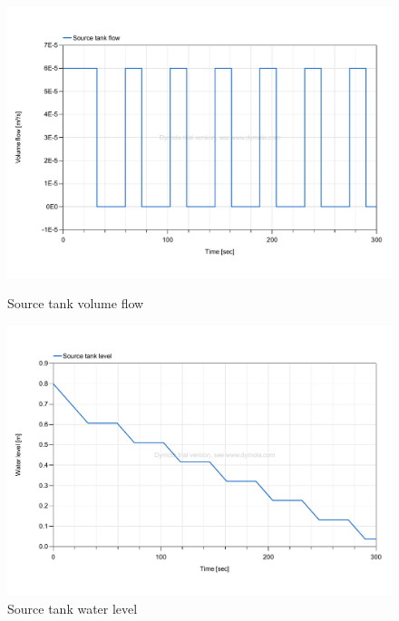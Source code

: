 \documentclass[11pt,a4paper,oneside]{article}
\begin{document}
\begin{figure}[H]
    \centering
    \begin{minipage}{0.45\textwidth}
        \centering
        \includegraphics*[width=\textwidth, keepaspectratio]{Figures/ex2b_sourceTankFlow.pdf}
        \caption[]{\label{fig:ex2b_sourceTankFlow} Source tank volume flow}
    \end{minipage}
    \hspace{0.05\textwidth}
    \begin{minipage}{0.45\textwidth}
        \centering
        \includegraphics*[width=\textwidth, keepaspectratio]{Figures/ex2b_sourceTankLevel.pdf}
        \caption[]{\label{fig:ex2b_sourceTankLevel} Source tank water level}
    \end{minipage}
\end{figure}
\end{document}
